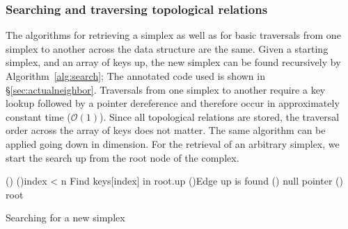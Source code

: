 	\subsubsection{Searching and traversing topological relations}

		\par The algorithms for retrieving a simplex as well as for basic traversals from one simplex to another across the data structure are the same.
		Given a starting simplex, and an array of keys up, the new simplex can be found recursively by Algorithm~\ref{alg:search}; The annotated code used is shown in \S\ref{sec:actualneighbor}.
		Traversals from one simplex to another require a key lookup followed by a pointer dereference and therefore occur in approximately constant time ($\mathcal{O}(1)$).
		Since all topological relations are stored, the traversal order across the array of keys does not matter.
		The same algorithm can be applied going down in dimension.
		For the retrieval of an arbitrary simplex, we start the search up from the root node of the complex.

\begin{algorithm}[ht!]


\SetStartEndCondition{ (}{)}{)}
\AlgoDisplayBlockMarkers\AlgoDisplayGroupMarkers\SetAlgoBlockMarkers{ \{}{ \}\ }%
\SetAlgoNoEnd\SetAlgoNoLine\DontPrintSemicolon
\SetStartEndCondition{ (}{)}{)}


\medskip
\Fn(){}{
	\If(){index < n}{
		Find keys[index] in root.up \;
		\eIf(){Edge up is found}{
			\Return {}
		}
		(){
			\Return null pointer
		}
	}
	\lElse(){
		\Return root
	}
}



\caption{Searching for a new simplex}
\label{alg:search}
\end{algorithm}
